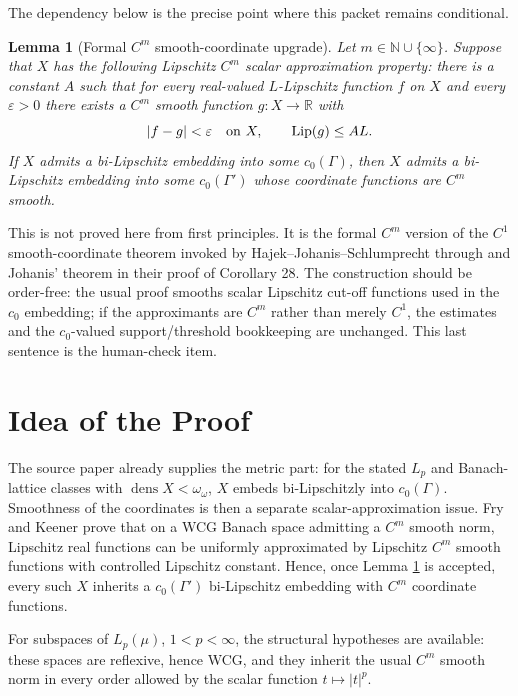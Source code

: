 \documentclass[11pt]{article}
\newtheorem{lemma}{Lemma}
\newcommand{\dens}{\operatorname{dens}}
\newcommand{\Lip}{\operatorname{Lip}}
\begin{document}
The dependency below is the precise point where this packet remains
conditional.

\begin{lemma}[Formal $C^m$ smooth-coordinate upgrade]\label{lem:coordinate}
Let $m\in\mathbb N\cup\{\infty\}$.  Suppose that $X$ has the following
Lipschitz $C^m$ scalar approximation property: there is a constant $A$ such
that for every real-valued $L$-Lipschitz function $f$ on $X$ and every
$\varepsilon>0$ there exists a $C^m$ smooth function $g:X\to\mathbb R$ with
\[
  |f-g|<\varepsilon\quad\hbox{on }X,
  \qquad
  \Lip(g)\leq A L .
\]
If $X$ admits a bi-Lipschitz embedding into some $c_0(\Gamma)$, then $X$
admits a bi-Lipschitz embedding into some $c_0(\Gamma')$ whose coordinate
functions are $C^m$ smooth.
\end{lemma}

This is not proved here from first principles.  It is the formal $C^m$ version
of the $C^1$ smooth-coordinate theorem invoked by Hajek--Johanis--Schlumprecht
through \cite[Theorem 7.63]{HJS240100831} and Johanis' theorem in their proof
of Corollary 28.  The construction should be order-free: the usual proof
smooths scalar Lipschitz cut-off functions used in the $c_0$ embedding; if the
approximants are $C^m$ rather than merely $C^1$, the estimates and the
$c_0$-valued support/threshold bookkeeping are unchanged.  This last sentence
is the human-check item.

\section*{Idea of the Proof}

The source paper already supplies the metric part: for the stated $L_p$ and
Banach-lattice classes with $\dens X<\omega_\omega$, $X$ embeds
bi-Lipschitzly into $c_0(\Gamma)$.  Smoothness of the coordinates is then a
separate scalar-approximation issue.  Fry and Keener prove that on a WCG
Banach space admitting a $C^m$ smooth norm, Lipschitz real functions can be
uniformly approximated by Lipschitz $C^m$ smooth functions with controlled
Lipschitz constant.  Hence, once Lemma \ref{lem:coordinate} is accepted, every
such $X$ inherits a $c_0(\Gamma')$ bi-Lipschitz embedding with $C^m$ coordinate
functions.

For subspaces of $L_p(\mu)$, $1<p<\infty$, the structural hypotheses are
available: these spaces are reflexive, hence WCG, and they inherit the usual
$C^m$ smooth norm in every order allowed by the scalar function
$t\mapsto |t|^p$.
\end{document}
